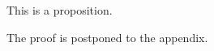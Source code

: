 \begin{prop}\label{prop}
  This is a proposition.
\end{prop}

The proof is postponed to the appendix.